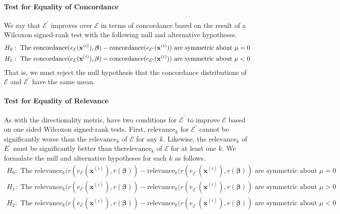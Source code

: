 \documentclass[mnsc,blindrev]{informs3}
\newcommand{\mE}{\mathcal{E}}
\begin{document}
        \paragraph{Test for Equality of Concordance}  
        We say that $\mE^\prime$ improves over $\mE$ in terms of concordance based on the result of a Wilcoxon signed-rank test with the following null and alternative hypotheses.
        \begin{align*}
            H_0: \text{ The } \text{\text{concordance}}(e_\mE(\mathbf{x}^{(i)}),\boldsymbol{\beta}) - \text{\text{concordance}}(e_{\mE^\prime}(\mathbf{x}^{(i)})) \text{ are symmetric about } \mu=0 \\
            H_1: \text{ The } \text{\text{concordance}}(e_\mE(\mathbf{x}^{(i)}),\boldsymbol{\beta}) - \text{\text{concordance}}(e_{\mE^\prime}(\mathbf{x}^{(i)})) \text{ are symmetric about } \mu<0     \end{align*}
        That is, we must reject the null hypothesis that the concordance distributions of $\mE$ and $\mE^\prime$ have the same mean.        
\paragraph{Test for Equality of Relevance}         As with the directionality metric, have two conditions for $\mE^\prime$ to improve $\mE$ based on one sided Wilcoxon signed-rank tests. First, $\text{relevance}_k$ for $\mE^\prime$ cannot be significantly worse than the $\text{relevance}_k$ of $\mE$ for any $k$. Likewise, the $\text{relevance}_k$ of $E^\prime$ must be significantly better than the$\text{relevance}_k$ of $\mE$ for at least one $k$. We formulate the null and alternative hypotheses for each $k$ as follows.
        \begin{align*}
            H_0: \text{ The } \text{relevance}_k(r(e_\mE(\mathbf{x}^{(i)}), r(\boldsymbol{\beta})) - \text{relevance}_k(r(e_{\mE^\prime}(\mathbf{x}^{(i)}), r(\boldsymbol{\beta})) \text{ are symmetric about } \mu=0 \\
            H_1: \text{ The }\text{relevance}_k(r(e_\mE(\mathbf{x}^{(i)}), r(\boldsymbol{\beta})) - \text{relevance}_k(r(e_{\mE^\prime}(\mathbf{x}^{(i)}), r(\boldsymbol{\beta})) \text{ are symmetric about } \mu > 0 \\
            H_2: \text{ The } \text{relevance}_k(r(e_\mE(\mathbf{x}^{(i)}), r(\boldsymbol{\beta})) - \text{relevance}_k(r(e_{\mE^\prime}(\mathbf{x}^{(i)}), r(\boldsymbol{\beta})) \text{ are symmetric about } \mu<0      \end{align*}
\end{document}
